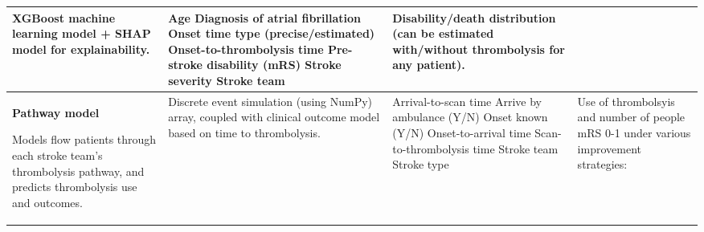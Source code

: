 \begin{landscape}
{\begin{table}
\begin{tabular}{|p{5cm}|p{5cm}|p{6cm}|p{6cm}|}
XGBoost machine learning model + SHAP model for explainability. &

Age\newline\vspace{3pt}
Diagnosis of atrial fibrillation\newline\vspace{3pt}
Onset time type (precise/estimated)\newline\vspace{3pt}
Onset-to-thrombolysis time\newline\vspace{3pt}
Pre-stroke disability (mRS)\newline\vspace{3pt}
Stroke severity\newline\vspace{3pt}
Stroke team\newline &

Disability/death distribution (can be estimated with/without thrombolysis for any patient). \\

\hline


\textbf{Pathway model}

\vspace{3mm}

Models flow patients through each stroke team’s thrombolysis pathway, and predicts thrombolysis use and outcomes. &

Discrete event simulation (using NumPy) array, coupled with clinical outcome model based on time to thrombolysis. &

Arrival-to-scan time\newline\vspace{3pt}
Arrive by ambulance (Y/N)\newline\vspace{3pt}
Onset known (Y/N)\newline\vspace{3pt}
Onset-to-arrival time\newline\vspace{3pt}
Scan-to-thrombolysis time\newline\vspace{3pt}
Stroke team\newline\vspace{3pt}
Stroke type &

Use of thrombolsyis and number of people mRS 0-1 under various improvement strategies:\newline\vspace{6pt}


\end{tabular}
\end{table}}
\end{landscape}
